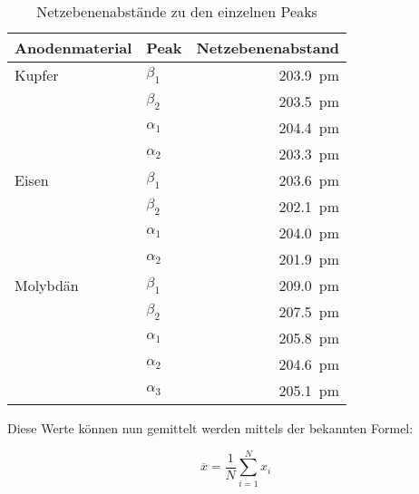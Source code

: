 \begin{table}[h!]
	\centering
	\small
    \caption{Netzebenenabst\"ande zu den einzelnen Peaks}
	\label{tab:lattices:LiF}
	\begin{tabular}{llr}
		\toprule

        Anodenmaterial & Peak & Netzebenenabstand \\

        \midrule

        Kupfer 								&
		$\beta_1$ 							&
	    \SI{203.9}{\pico\meter}  \\

		&
		$\beta_2$							&
	    \SI{203.5}{\pico\meter}  \\

		&
		$\alpha_1$ &
 	    \SI{204.4}{\pico\meter} \\

		&
		$\alpha_2$ &
 	    \SI{203.3}{\pico\meter} \\

        Eisen &
		$\beta_1$ &
 	    \SI{203.6}{\pico\meter} \\

		&
		$\beta_2$ &
 	    \SI{202.1}{\pico\meter} \\

		&
		$\alpha_1$ &
 	    \SI{204.0}{\pico\meter} \\

		&
		$\alpha_2$ &
 	    \SI{201.9}{\pico\meter} \\

        Molybd\"an &
		$\beta_1$ &
 	    \SI{209.0}{\pico\meter} \\

		&
		$\beta_2$ &
 	    \SI{207.5}{\pico\meter} \\

		&
		$\alpha_1$ &
 	    \SI{205.8}{\pico\meter} \\

		&
		$\alpha_2$ &
 	    \SI{204.6}{\pico\meter} \\

		&
		$\alpha_3$ &
 	    \SI{205.1}{\pico\meter} \\

		\bottomrule
	\end{tabular}
\end{table}

Diese Werte k\"onnen nun gemittelt werden mittels der bekannten Formel:

\begin{equation*}
    \overline{x} = \frac{1}{N} \sum_{i=1}^{N}{x_i}
\end{equation*}


